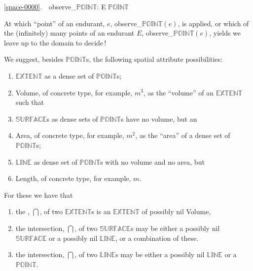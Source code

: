\bp
\ref{space-0000}.\ \ observe\_$\mathbb{POINT}$: E {\RIGHTARROW} $\mathbb{POINT}$
\ep

\mnewfoil

\noindent
\begynd
\pind At which ``point'' of an endurant, $e$, \nyl
      \textsf{observe\_$\mathbb{POINT}(e)$}, is applied, or
\pind which of the (infinitely) many points of an endurant $E$, \nyl
      \textsf{observe\_$\mathbb{POINT}(e)$}, yields \nyl
      we leave up to the domain  to decide\,!
\afslut
\afslut


\begynd
\pind We suggest, besides $\mathbb{POINT}$s,
      the following spatial attribute possibilities:
\begin{enumerate}\setei
\item \label{spa-attr-0000} $\mathbb{EXTENT}$ as a dense set of
  $\mathbb{POINT}$s;
\item \label{spa-attr-0010} \textsf{Volume}, of concrete type, for
  example, $m^3$, as the ``volume'' of an
  $\mathbb{EXTENT}$ such that
\item \label{spa-attr-0020} $\mathbb{SURFACE}$s as dense sets of
  $\mathbb{POINT}$s have no volume, but an
\item \label{spa-attr-0030} \textsf{Area}, of concrete type, for
  example, $m^2$, as the ``area'' of a dense set of
  $\mathbb{POINT}$s;
\item \label{spa-attr-0040} $\mathbb{LINE}$ as dense set of
  $\mathbb{POINT}$s with no volume and no area, but
\item \label{spa-attr-0050} \textsf{Length}, of concrete type, for
  example, $m$.
\savei\end{enumerate}
\pos{\psno}{\mnewfoil}
\noindent
\pind For these we have that
\begin{enumerate}\setei
\item \label{spa-attr-0060} the , $\bigcap$, of two
  $\mathbb{EXTENT}$s is an  $\mathbb{EXTENT}$ of possibly nil
  \textsf{Volume}, 
\item \label{spa-attr-0070} the intersection, $\bigcap$, of two
  $\mathbb{SURFACE}$s may be either a possibly nil $\mathbb{SURFACE}$
  or a possibly nil $\mathbb{LINE}$, or a combination of these.
\item \label{spa-attr-0080} the intersection, $\bigcap$, of two
  $\mathbb{LINE}$s may be either a possibly nil $\mathbb{LINE}$
  or a $\mathbb{POINT}$.
\savei\end{enumerate}
